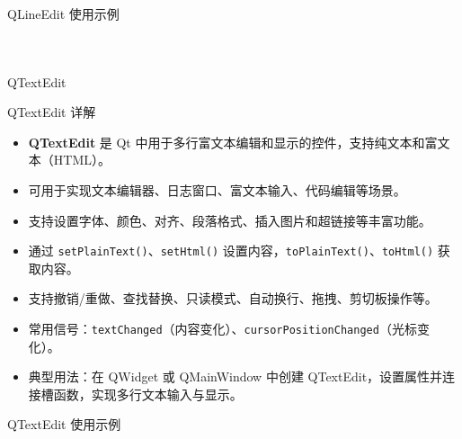 \documentclass[UTF8,aspectratio=169]{beamer}
\begin{document}
\begin{frame}[fragile]{QLineEdit 使用示例}
    \begin{columns}
        \begin{column}{0.48\textwidth}
            \inputminted[firstline=1,lastline=19]{cpp}{code/qt_lineedit_example.cpp}
        \end{column}
        \begin{column}{0.48\textwidth}
            \inputminted[firstline=20,lastline=38]{cpp}{code/qt_lineedit_example.cpp}
        \end{column}
    \end{columns}
\end{frame}

\begin{frame}{QTextEdit}
    \begin{ytublock}{QTextEdit 详解}
        \begin{itemize}
            \item \textbf{QTextEdit} 是 Qt 中用于多行富文本编辑和显示的控件，支持纯文本和富文本（HTML）。
            \item 可用于实现文本编辑器、日志窗口、富文本输入、代码编辑等场景。
            \item 支持设置字体、颜色、对齐、段落格式、插入图片和超链接等丰富功能。
            \item 通过 \texttt{setPlainText()}、\texttt{setHtml()} 设置内容，\texttt{toPlainText()}、\texttt{toHtml()} 获取内容。
            \item 支持撤销/重做、查找替换、只读模式、自动换行、拖拽、剪切板操作等。
            \item 常用信号：\texttt{textChanged}（内容变化）、\texttt{cursorPositionChanged}（光标变化）。
            \item 典型用法：在 QWidget 或 QMainWindow 中创建 QTextEdit，设置属性并连接槽函数，实现多行文本输入与显示。
        \end{itemize}
    \end{ytublock}
\end{frame}

\begin{frame}[fragile]{QTextEdit 使用示例}
    \begin{columns}
        \begin{column}{0.48\textwidth}
            \inputminted[firstline=1,lastline=18]{cpp}{code/qt_textedit_example.cpp}
        \end{column}
        \begin{column}{0.48\textwidth}
            \inputminted[firstline=19,lastline=36]{cpp}{code/qt_textedit_example.cpp}
        \end{column}
    \end{columns}
\end{frame}
\end{document}
